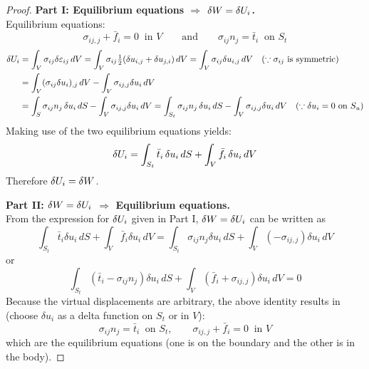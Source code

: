 \begin{proof}
\textbf{Part I: Equilibrium equations $\Rightarrow$ $\delta W = \delta U_i$.}\\
Equilibrium equations:
\begin{equation*}
  \sigma_{ij,j} + \bar f_i = 0\ \text{ in } V \qquad\text{and}\qquad \sigma_{ij}n_j = \bar t_i\ \text{ on } S_t
\end{equation*}
\begin{equation*}
  \begin{aligned}
    \delta U_i &= \int_V\sigma_{ij}\delta\varepsilon_{ij}\,dV = \int_V\sigma_{ij}\tfrac12(\delta u_{i,j}+\delta u_{j,i})\,dV = \int_V\sigma_{ij}\delta u_{i,j}\,dV\quad(\because\sigma_{ij}\text{ is symmetric})\\
          &= \int_V(\sigma_{ij}\delta u_i)_{,j}\,dV - \int_V\sigma_{ij,j}\delta u_i\,dV\\
          &= \int_S\sigma_{ij}n_j\,\delta u_i\,dS - \int_V\sigma_{ij,j}\delta u_i\,dV = \int_{S_t}\sigma_{ij}n_j\,\delta u_i\,dS - \int_V\sigma_{ij,j}\delta u_i\,dV\quad(\because\delta u_i = 0\text{ on }S_u)
  \end{aligned}
\end{equation*}
Making use of the two equilibrium equations yields:
\begin{equation*}
  \delta U_i = \int_{S_t}\bar t_i\,\delta u_i\,dS + \int_V\bar f_i\,\delta u_i\,dV
\end{equation*}
Therefore $\delta U_i = \delta W$.

\textbf{Part II: $\delta W = \delta U_i$ $\Rightarrow$ Equilibrium equations.}\\
From the expression for $\delta U_i$ given in Part I, $\delta W = \delta U_i$ can be written as
\begin{equation*}
  \int_{S_t}\bar t_i\delta u_i\,dS + \int_V\bar f_i\delta u_i\,dV = \int_{S_t}\sigma_{ij}n_j\delta u_i\,dS + \int_V(-\sigma_{ij,j})\delta u_i\,dV
\end{equation*}
or
\begin{equation*}
  \int_{S_t}(\bar t_i - \sigma_{ij}n_j)\delta u_i\,dS + \int_V(\bar f_i + \sigma_{ij,j})\delta u_i\,dV = 0
\end{equation*}
Because the virtual displacements are arbitrary, the above identity results in (choose $\delta u_i$ as a delta function on $S_t$ or in $V$):
\begin{equation*}
  \sigma_{ij}n_j = \bar t_i\ \text{ on } S_t,\qquad \sigma_{ij,j}+\bar f_i = 0\ \text{ in } V
\end{equation*}
which are the equilibrium equations (one is on the boundary and the other is in the body).
\end{proof}


